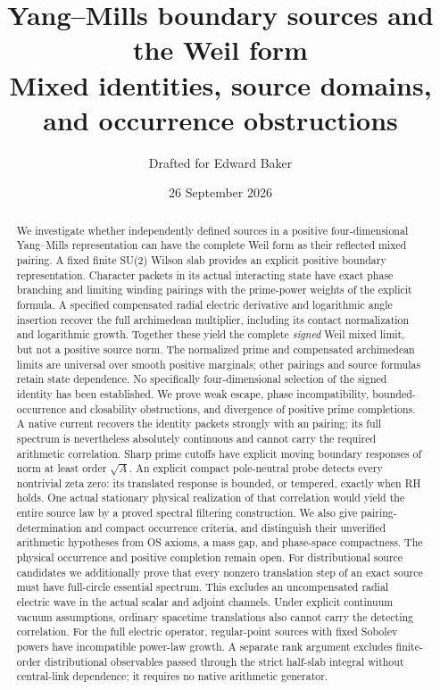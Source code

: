 \documentclass[11pt]{article}
\title{Yang--Mills boundary sources and the Weil form\\[5pt]
\large Mixed identities, source domains, and occurrence obstructions}
\author{Drafted for Edward Baker}
\date{26 September 2026}
\begin{document}
\maketitle
\begin{abstract}
We investigate whether independently defined sources in a positive
four-dimensional Yang--Mills representation can have the complete Weil
form as their reflected mixed pairing. A fixed finite SU(2) Wilson slab
provides an explicit positive boundary representation. Character packets
in its actual interacting state have exact phase branching and limiting
winding pairings with the prime-power weights of the explicit formula.
A specified compensated radial electric derivative and logarithmic
angle insertion recover the full archimedean multiplier, including its
contact normalization and logarithmic growth. Together these yield the
complete \emph{signed} Weil mixed limit, but not a positive source norm.
The normalized prime and compensated archimedean limits are universal
over smooth positive marginals; other pairings and source formulas
retain state dependence. No specifically four-dimensional selection
of the signed identity has been established.
We prove weak escape, phase incompatibility, bounded-occurrence and
closability obstructions, and divergence of positive prime completions.
A native current recovers the identity packets strongly with an \Ltwo{}
pairing; its full spectrum is nevertheless absolutely continuous and
cannot carry the required arithmetic correlation. Sharp prime cutoffs
have explicit moving boundary responses of norm at least order
$\sqrt A$. An explicit compact pole-neutral probe detects every
nontrivial zeta zero: its translated response is bounded, or tempered,
exactly when RH holds. One actual stationary physical realization of
that correlation would yield the entire source law by a proved spectral
filtering construction. We also give pairing-determination and compact
occurrence criteria, and distinguish their unverified arithmetic
hypotheses from OS axioms, a mass gap, and phase-space compactness.
The physical occurrence and positive completion remain open.
For distributional source candidates we additionally prove that every
nonzero translation step of an exact source must have full-circle
essential spectrum. This excludes an uncompensated radial electric
wave in the actual scalar and adjoint channels. Under explicit
continuum vacuum assumptions, ordinary spacetime translations also
cannot carry the detecting correlation.
For the full electric operator, regular-point sources with fixed
Sobolev powers have incompatible power-law growth. A separate rank
argument excludes finite-order distributional observables passed
through the strict half-slab integral without central-link dependence;
it requires no native arithmetic generator.
\end{abstract}
\end{document}
